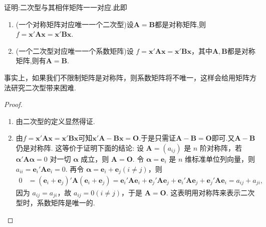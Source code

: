 \documentclass[../../main.tex]{subfiles}
\begin{document}
\begin{theorem}\label{theorem:二次型与其相伴矩阵一一对应}
证明:二次型与其相伴矩阵一一对应.此即
\begin{enumerate}[(1)]
\item (一个对称矩阵对应唯一一个二次型)设$\boldsymbol{A}=\boldsymbol{B}$都是对称矩阵,则$f = \boldsymbol{x}'\boldsymbol{A}\boldsymbol{x}=\boldsymbol{x}'\boldsymbol{B}\boldsymbol{x}$.

\item (一个二次型对应唯一一个系数矩阵)设 $f = \boldsymbol{x}'\boldsymbol{A}\boldsymbol{x}=\boldsymbol{x}'\boldsymbol{B}\boldsymbol{x}$，其中$\boldsymbol{A},\boldsymbol{B}$都是对称矩阵,则有$\boldsymbol{A}=\boldsymbol{B}$. 
\end{enumerate}
\end{theorem}
\begin{remark}
事实上，如果我们不限制矩阵是对称阵，则系数矩阵将不唯一，这样会给用矩阵方法研究二次型带来困难.
\end{remark}
\begin{proof}
\begin{enumerate}[(1)]
\item 由二次型的定义显然得证.

\item 由$f = \boldsymbol{x}'\boldsymbol{A}\boldsymbol{x}=\boldsymbol{x}'\boldsymbol{B}\boldsymbol{x}$可知$\boldsymbol{x}'\boldsymbol{A-B}\boldsymbol{x}=\boldsymbol{O}$.于是只需证$\boldsymbol{A-B}=\boldsymbol{O}$即可.又$\boldsymbol{A-B}$仍是对称阵.
这等价于证明下面的结论: 设 $\boldsymbol{A}=(a_{ij})$ 是 $n$ 阶对称阵，若 $\boldsymbol{\alpha}'\boldsymbol{A}\boldsymbol{\alpha}=0$ 对一切 $\boldsymbol{\alpha}$ 成立，则 $\boldsymbol{A}=\boldsymbol{O}$. 令 $\boldsymbol{\alpha}=\boldsymbol{e}_i$ 是 $n$ 维标准单位列向量，则 $a_{ii}=\boldsymbol{e}_i'\boldsymbol{A}\boldsymbol{e}_i = 0$. 再令 $\boldsymbol{\alpha}=\boldsymbol{e}_i+\boldsymbol{e}_j (i\neq j)$，则
\begin{align*}
0&=(\boldsymbol{e}_i+\boldsymbol{e}_j)'\boldsymbol{A}(\boldsymbol{e}_i+\boldsymbol{e}_j)=\boldsymbol{e}_i'\boldsymbol{A}\boldsymbol{e}_i+\boldsymbol{e}_j'\boldsymbol{A}\boldsymbol{e}_j+\boldsymbol{e}_i'\boldsymbol{A}\boldsymbol{e}_j+\boldsymbol{e}_j'\boldsymbol{A}\boldsymbol{e}_i=a_{ij}+a_{ji},
\end{align*}
因为 $a_{ij}=a_{ji}$，故 $a_{ij}=0 (i\neq j)$，于是 $\boldsymbol{A}=\boldsymbol{O}$. 这表明用对称阵来表示二次型时，系数矩阵是唯一的. 
\end{enumerate}
\end{proof}
\end{document}
